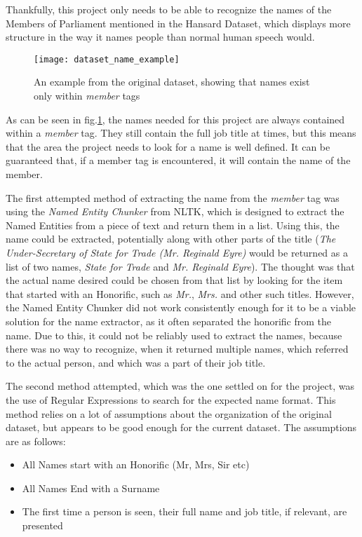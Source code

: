 Thankfully, this project only needs to be able to recognize the names of the Members of Parliament mentioned in the Hansard Dataset, which displays more structure in the way it names people than normal human speech would.

\begin{figure}[ht]
\texttt{[image: dataset\_name\_example]}
\caption{An example from the original dataset, showing that names exist only within \emph{member} tags}
\label{fig:dataset_name_example}
\end{figure}

As can be seen in fig.\ref{fig:dataset_name_example}, the names needed for this project are always contained within a \emph{member} tag. They still contain the full job title at times, but this means that the area the project needs to look for a name is well defined. It can be guaranteed that, if a member tag is encountered, it will contain the name of the member.

The first attempted method of extracting the name from the \emph{member} tag was using the \emph{Named Entity Chunker} from NLTK, which is designed to extract the Named Entities from a piece of text and return them in a list. Using this, the name could be extracted, potentially along with other parts of the title (\emph{The Under-Secretary of State for Trade (Mr. Reginald Eyre)} would be returned as a list of two names, \emph{State for Trade} and \emph{Mr. Reginald Eyre}). The thought was that the actual name desired could be chosen from that list by looking for the item that started with an Honorific, such as \emph{Mr.}, \emph{Mrs.} and other such titles. However, the Named Entity Chunker did not work consistently enough for it to be a viable solution for the name extractor, as it often separated the honorific from the name. Due to this, it could not be reliably used to extract the names, because there was no way to recognize, when it returned multiple names, which referred to the actual person, and which was a part of their job title.

The second method attempted, which was the one settled on for the project, was the use of Regular Expressions to search for the expected name format. This method relies on a lot of assumptions about the organization of the original dataset, but appears to be good enough for the current dataset. The assumptions are as follows:
\begin{itemize}
	\item All Names start with an Honorific (Mr, Mrs, Sir etc)
	\item All Names End with a Surname
	\item The first time a person is seen, their full name and job title, if relevant, are presented
\end{itemize}

